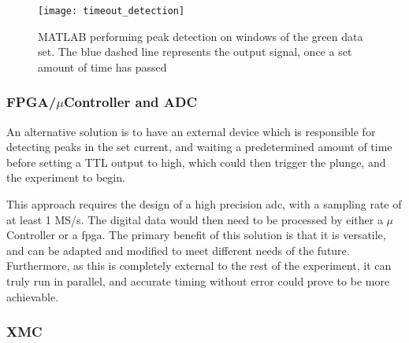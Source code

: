 \begin{figure}[htbp!]
	\centering
	\texttt{[image: timeout\_detection]}
	\caption{MATLAB performing peak detection on windows of the green data set. The blue dashed line represents the output signal, once a set amount of time has passed}
	\label{fig::timeout_detection}
\end{figure}

\subsubsection{FPGA/$\mu$Controller and ADC}
An alternative solution is to have an external device which is responsible for detecting peaks in the \gls{set} current, and waiting a predetermined amount of time before setting a TTL output to high, which could then trigger the plunge, and the experiment to begin.

This approach requires the design of a high precision \gls{adc}, with a sampling rate of at least 1 MS/s. The digital data would then need to be processed by either a $\mu$Controller or a \gls{fpga}. The primary benefit of this solution is that it is versatile, and can be adapted and modified to meet different needs of the future. Furthermore, as this is completely external to the rest of the experiment, it can truly run in parallel, and accurate timing without error could prove to be more achievable.
\subsubsection{XMC}
